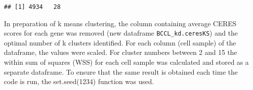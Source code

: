 \documentclass[]{article}
\newenvironment{Shaded}{\begin{snugshade}}{\end{snugshade}}
\newcommand{\CommentTok}[1]{\textcolor[rgb]{0.56,0.35,0.01}{\textit{#1}}}
\newcommand{\DecValTok}[1]{\textcolor[rgb]{0.00,0.00,0.81}{#1}}
\newcommand{\KeywordTok}[1]{\textcolor[rgb]{0.13,0.29,0.53}{\textbf{#1}}}
\newcommand{\NormalTok}[1]{#1}
\newcommand{\OperatorTok}[1]{\textcolor[rgb]{0.81,0.36,0.00}{\textbf{#1}}}
\newcommand{\StringTok}[1]{\textcolor[rgb]{0.31,0.60,0.02}{#1}}
\begin{document}
\begin{Shaded}
\end{Shaded}

\begin{verbatim}
## [1] 4934   28
\end{verbatim}

In preparation of k means clustering, the column containing average
CERES scores for each gene was removed (new dataframe
\texttt{BCCL\_kd.ceresKS}) and the optimal number of k clusters
identified. For each column (cell sample) of the dataframe, the values
were scaled. For cluster numbers between 2 and 15 the within sum of
squares (WSS) for each cell sample was calculated and stored as a
separate dataframe. To ensure that the same result is obtained each time
the code is run, the set.seed(1234) function was used.
\end{document}
